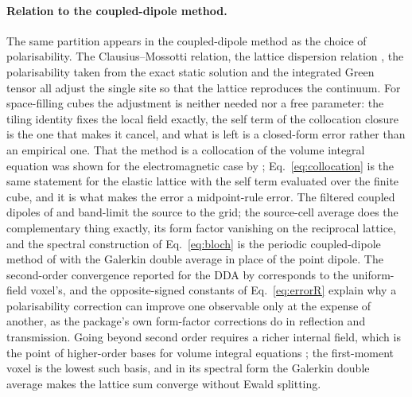 \documentclass[11pt,a4paper]{article}
\begin{document}
\paragraph{Relation to the coupled-dipole method.} The same partition appears in the
coupled-dipole method as the choice of polarisability. The Clausius--Mossotti relation, the lattice
dispersion relation \citep{Draine1993}, the polarisability taken from the exact static solution
\citep{Rahmani2002} and the integrated Green tensor \citep{Chaumet2004} all adjust the single site
so that the lattice reproduces the continuum. For space-filling cubes the adjustment is neither
needed nor a free parameter: the tiling identity fixes the local field exactly, the self term of the
collocation closure is the one that makes it cancel, and what is left is a closed-form error rather
than an empirical one. That the method is a collocation of the volume integral equation was shown
for the electromagnetic case by \citet{Lakhtakia1992}; Eq.~\eqref{eq:collocation} is the same
statement for the elastic lattice with the self term evaluated over the finite cube, and it is what
makes the error a midpoint-rule error. The filtered coupled dipoles of \citet{Piller1998} and
\citet{Yurkin2010} band-limit the source to the grid; the source-cell average does the
complementary thing exactly, its form factor vanishing on the reciprocal lattice, and the spectral
construction of Eq.~\eqref{eq:bloch} is the periodic coupled-dipole method of \citet{Chaumet2003}
with the Galerkin double average in place of the point dipole. The second-order convergence
reported for the DDA by \citet{Yurkin2006} corresponds to the uniform-field voxel's, and the
opposite-signed constants of Eq.~\eqref{eq:errorR} explain why a polarisability correction can
improve one observable only at the expense of another, as the package's own form-factor corrections
do in reflection and transmission. Going beyond second order requires a richer internal field, which
is the point of higher-order bases for volume integral equations
\citep{Chobanyan2013,Georgakis2020}; the first-moment voxel is the
lowest such basis, and in its spectral form the Galerkin double average makes the lattice sum
converge without Ewald splitting.
\end{document}
